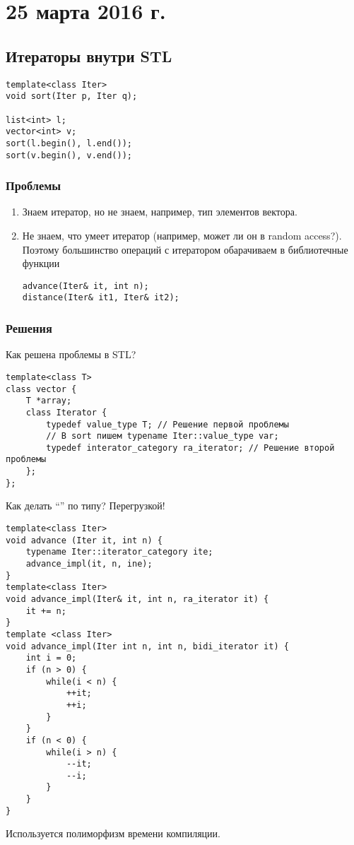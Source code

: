 \section{25 марта 2016 г.}

\subsection{Итераторы внутри STL}

\begin{verbatim}
template<class Iter>
void sort(Iter p, Iter q);

list<int> l;
vector<int> v;
sort(l.begin(), l.end());
sort(v.begin(), v.end());
\end{verbatim}

\subsubsection*{Проблемы}
\begin{enumerate}
    \item Знаем итератор, но не знаем, например, тип элементов вектора.
    \item Не знаем, что умеет итератор (например, может ли он в random access?). Поэтому большинство операций с итератором обарачиваем в библиотечные функции
    \begin{verbatim}
advance(Iter& it, int n);
distance(Iter& it1, Iter& it2);
    \end{verbatim}
\end{enumerate}

\subsubsection*{Решения}
Как решена проблемы в STL?
\begin{verbatim}
template<class T>
class vector {
    T *array;
    class Iterator {
        typedef value_type T; // Решение первой проблемы
        // В sort пишем typename Iter::value_type var; 
        typedef interator_category ra_iterator; // Решение второй проблемы
    };
};
\end{verbatim}

Как делать ``'' по типу? Перегрузкой!
\begin{verbatim}
template<class Iter>
void advance (Iter it, int n) {
    typename Iter::iterator_category ite;
    advance_impl(it, n, ine);
}
template<class Iter>
void advance_impl(Iter& it, int n, ra_iterator it) {
    it += n;
}
template <class Iter>
void advance_impl(Iter int n, int n, bidi_iterator it) {
    int i = 0;
    if (n > 0) {
        while(i < n) {
            ++it;
            ++i;
        }
    }
    if (n < 0) {
        while(i > n) {
            --it;
            --i;
        }
    }
}
\end{verbatim}
Используется полиморфизм времени компиляции. %

